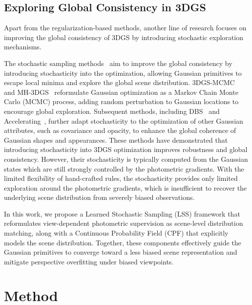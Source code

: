 \documentclass[lettersize,journal]{IEEEtran}
\begin{document}
\subsection{Exploring Global Consistency in 3DGS}

Apart from the regularization-based methods, another line of research focuses on improving the global consistency of 3DGS by introducing stochastic exploration mechanisms. 

The stochastic sampling methods~\cite{accelerating, mcmc, beta,mh3dgs} aim to improve the global consistency by introducing stochasticity into the optimization, allowing Gaussian primitives to escape local minima and explore the global scene distribution. 
3DGS-MCMC~\cite{mcmc} and MH-3DGS~\cite{mh3dgs} reformulate Gaussian optimization as a Markov Chain Monte Carlo (MCMC) process, adding random perturbation to Gaussian locations to encourage global exploration.
Subsequent methods, including DBS~\cite{beta} and Accelerating~\cite{accelerating}, further adapt stochasticity to the optimization of other Gaussian attributes, such as covariance and opacity, to enhance the global coherence of Gaussian shapes and appearances. These methods have demonstrated that introducing stochasticity into 3DGS optimization improves robustness and global consistency. 
However, their stochasticity is typically computed from the Gaussian states which are still strongly controlled by the photometric gradients. With the limited flexibility of hand-crafted rules, the stochasticity provides only limited exploration around the photometric gradients, which is insufficient to recover the underlying scene distribution from severely biased observations.

In this work, we propose a Learned Stochastic Sampling (LSS) framework that reformulates view-dependent photometric supervision as scene-level distribution matching, 
along with a Continuous Probability Field (CPF) that explicitly models the scene distribution. Together, these components effectively guide the Gaussian primitives to converge toward a less biased scene representation and mitigate perspective overfitting under biased viewpoints.


\section{Method}
\end{document}
